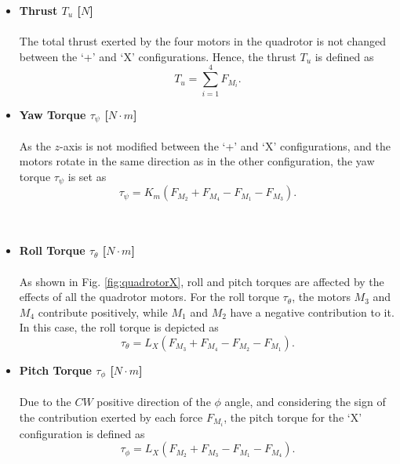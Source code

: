 \begin{itemize}
\item \textbf{Thrust $T_u$ [$N$]}\\\\
The total thrust exerted by the four motors in the quadrotor is not changed between the `+' and `X' configurations. Hence, the thrust $T_u$ is defined as
\begin{equation}
\label{ec:ux}
T_u = \sum_{i=1}^{4}F_{M_i}.
\end{equation}

\item \textbf{Yaw Torque $\tau_{\psi}$ [$N\cdot m$]}\\\\
As the $z$-axis is not modified between the `+' and `X' configurations, and the motors rotate in the same direction as in the other configuration, the yaw torque $\tau_\psi$ is set as
\begin{equation}
\label{ec:taupsix}
\tau_{\psi} = K_{m}(F_{M_2} + F_{M_4} - F_{M_1} - F_{M_3}).
\end{equation}
\\\\
\item \textbf{Roll Torque $\tau_{\theta}$ [$N\cdot m$]}\\\\
As shown in Fig. \ref{fig:quadrotorX}, roll and pitch torques are affected by the effects of all the quadrotor motors. For the roll torque $\tau_{\theta}$, the motors $M_3$ and $M_4$ contribute positively, while $M_1$ and $M_2$ have a negative contribution to it. In this case, the roll torque is depicted as
\begin{equation}
\label{ec:tauthetax}
\tau_{\theta} = L_{X}(F_{M_3}+F_{M_4}-F_{M_2}-F_{M_1}).
\end{equation}

\item \textbf{Pitch Torque $\tau_{\phi}$ [$N\cdot m$]}\\\\
Due to the $CW$ positive direction of the $\phi$ angle, and considering the sign of the contribution exerted by each force $F_{M_i}$, the pitch torque for the `X' configuration is defined as
\begin{equation}
\label{ec:tauphix}
\tau_{\phi} = L_{X}(F_{M_2}+F_{M_3}-F_{M_1}-F_{M_4}).
\end{equation}

\end{itemize}

